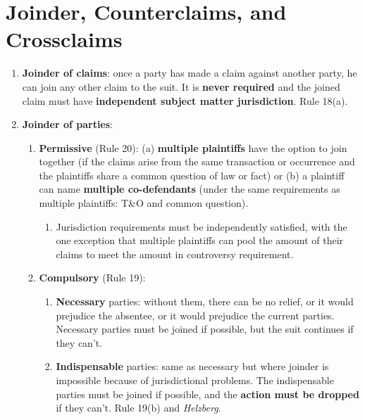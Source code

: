 \section{Joinder, Counterclaims, and Crossclaims}

\begin{enumerate}
    \item \textbf{Joinder of claims}: once a party has made a claim against 
    another party, he can join any other claim to the suit. It is 
    \textbf{never required} and the joined claim must have \textbf{independent 
    subject matter jurisdiction}. Rule 18(a).
    \item \textbf{Joinder of parties}:
    \begin{enumerate}
        \item \textbf{Permissive} (Rule 20): (a) \textbf{multiple plaintiffs} have the 
        option to join together (if the claims arise from the same transaction 
        or occurrence and the plaintiffs share a common question of law or 
        fact) or (b) a plaintiff can name \textbf{multiple co-defendants} 
        (under the same requirements as multiple plaintiffs: T\&O and common 
        question).
        \begin{enumerate}
            \item Jurisdiction requirements must be independently satisfied, 
            with the one exception that multiple plaintiffs can pool the 
            amount of their claims to meet the amount in controversy 
            requirement.
        \end{enumerate}
        \item \textbf{Compulsory} (Rule 19):
        \begin{enumerate}
            \item \textbf{Necessary} parties: without them, there can be no 
            relief, or it would prejudice the absentee, or it would prejudice 
            the current parties. Necessary parties must be joined if possible, 
            but the suit continues if they can't. 
            \item \textbf{Indispensable} parties: same as necessary but where 
            joinder is impossible because of jurisdictional problems. The 
            indispensable parties must be joined if possible, and 
            the \textbf{action must be dropped} if they can't. Rule 19(b) and 
            \emph{Helzberg}.
        \end{enumerate}
    \end{enumerate}

\end{enumerate}
